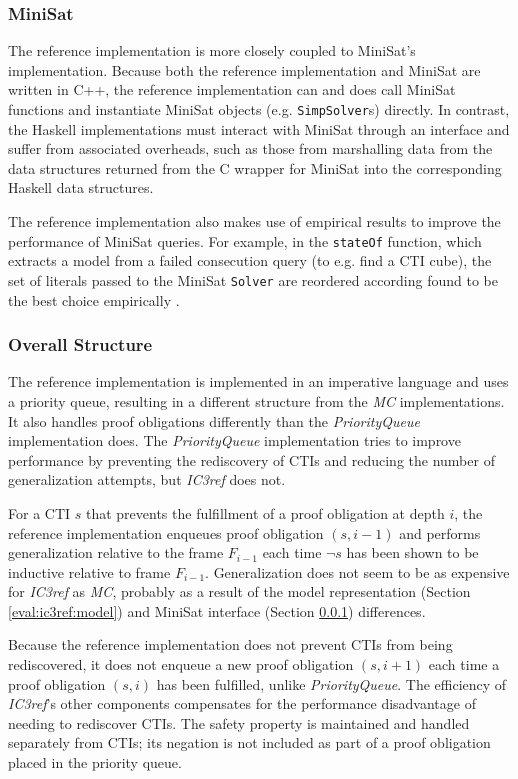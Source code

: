 \documentclass[12pt,a4paper,twoside,openright]{report}
\begin{document}
{{\subsubsection{MiniSat}
\label{eval:ic3ref:minisat}
The reference implementation is more closely coupled to MiniSat's implementation. Because both the reference
implementation and MiniSat are written in C++, the reference implementation can and does call MiniSat functions
and instantiate MiniSat objects (e.g. \verb,SimpSolver,s) directly.
In contrast, the Haskell implementations
must interact with MiniSat through an interface and suffer from associated overheads, such as those from
marshalling data from the data structures returned from the C wrapper for MiniSat into the corresponding
Haskell data structures.

The reference implementation also makes use of empirical results to improve the performance of MiniSat queries.
For example, in the \verb,stateOf, function, which extracts a model from a failed consecution query
(to e.g. find a CTI cube), the set of literals passed to the MiniSat \verb,Solver, are reordered according
found to be the best choice empirically \cite{minisat}.

\subsubsection{Overall Structure}

The reference implementation is implemented in an imperative language and
uses a priority queue, resulting in a different structure from the
\emph{MC} implementations. It also handles proof obligations
differently than the \emph{PriorityQueue} implementation does.
The \emph{PriorityQueue} implementation tries to improve performance by
preventing the rediscovery of
CTIs and reducing the number of generalization attempts,
but \emph{IC3ref} does not.

For a CTI $s$ that prevents the fulfillment
of a proof obligation at depth $i$, the reference implementation enqueues proof
obligation $(s,i - 1)$
and performs generalization relative to the frame $F_{i - 1}$ each time $\neg s$ has been shown
to be inductive relative to frame $F_{i - 1}$. Generalization does not seem
to be as expensive for \emph{IC3ref} as \emph{MC}, probably as a
result of the model representation (Section \ref{eval:ic3ref:model}) and
MiniSat interface (Section \ref{eval:ic3ref:minisat}) differences.

Because the reference implementation does not prevent CTIs from being rediscovered,
it does not
enqueue a new proof obligation $(s, i+1)$ each time a proof obligation $(s, i)$ has been
fulfilled, unlike \emph{PriorityQueue}.
The efficiency of \emph{IC3ref}'s other components compensates
for the performance disadvantage of needing to rediscover CTIs.
The safety property is maintained and
handled separately from CTIs; its negation is not included as part of a proof obligation
placed in the priority queue.

}}
\end{document}
